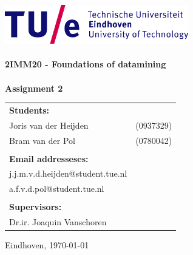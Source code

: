 \begin{titlepage}

\begin{center}

\includegraphics[width=0.6\textwidth]{./Figures/TUe}~\\[2cm]



\HRule \\[0.4cm]
{ \huge \bfseries 2IMM20 - Foundations of datamining\\[0.3cm] }
\HRule \\[1.5cm]
\textbf{Assignment 2}



\vfill

\begin{table}[h]
\begin{tabular}{ll}
\textbf{Students:} & \\
Joris van der Heijden & (0937329)\\
Bram van der Pol & (0780042)\\

\\
\textbf{Email addresseses:} & \\
j.j.m.v.d.heijden@student.tue.nl \\
a.f.v.d.pol@student.tue.nl \\
\\
\textbf{Supervisors:} &\\
Dr.ir. Joaquin Vanschoren
\\

\end{tabular}
\end{table}



\large
{ Eindhoven, \today}

\end{center}


\end{titlepage}
